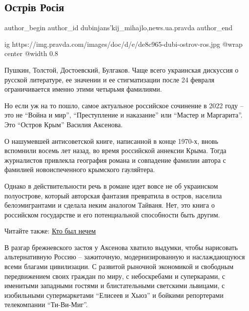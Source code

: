  
 
 
 
 
 
\subsection{Острів Росія}
\label{sec:14_05_2022.stz.news.ua.pravda.1.ostriv_rosia}
 
\ifcmt
 author_begin
   author_id dubinjans'kij_mihajlo,news.ua.pravda
 author_end
\fi

\ifcmt
  ig https://img.pravda.com/images/doc/d/e/de8c965-dubi-ostrov-ros.jpg
  @wrap center
  @width 0.8
\fi

Пушкин, Толстой, Достоевский, Булгаков. Чаще всего украинская дискуссия о
русской литературе, ее значении и ее стигматизации после 24 февраля
ограничивается именно этими четырьмя фамилиями.

Но если уж на то пошло, самое актуальное российское сочинение в 2022 году – это
не \enquote{Война и мир}, \enquote{Преступление и наказание} или
\enquote{Мастер и Маргарита}. Это \enquote{Остров Крым} Василия Аксенова.

О нашумевшей антисоветской книге, написанной в конце 1970-х, вновь вспомнили
восемь лет назад, во время российской аннексии Крыма. Тогда журналистов
привлекла география романа и совпадение фамилии автора с фамилией
новоиспеченного крымского гауляйтера.

Однако в действительности речь в романе идет вовсе не об украинском
полуострове, который авторская фантазия превратила в остров, населила
белоэмигрантами и сделала неким аналогом Тайваня. Нет, это книга о российском
государстве и его потенциальной способности быть другим.

\begin{qqnagolos}
Читайте также: \href{https://www.pravda.com.ua/rus/articles/2022/04/30/7342793/}{Кто был нечем}
\end{qqnagolos}

В разгар брежневского застоя у Аксенова хватило выдумки, чтобы нарисовать
альтернативную Россию – зажиточную, модернизированную и наслаждающуюся всеми
благами цивилизации. С развитой рыночной экономикой и свободным передвижением
своих граждан по миру, с небоскребами и суперкарами, с именитыми западными
гостями и блистательными светскими львицами, с изобильными супермаркетами
\enquote{Елисеев и Хьюз} и бойкими репортерами телекомпании \enquote{Ти-Ви-Миг}.

